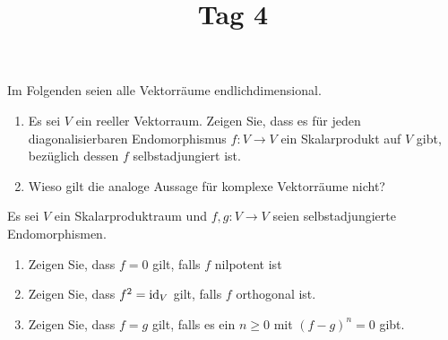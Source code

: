 \documentclass[a4paper, 10pt]{scrartcl}
\title{Tag 4}
\author{}
\date{}
\begin{document}
Im Folgenden seien alle Vektorräume endlichdimensional.





\begin{question}[subtitle = Diagonalisierbarkeit und Selbstadjungiertheit]
  \begin{enumerate}
    \item
      Es sei $V$ ein reeller Vektorraum.
      Zeigen Sie, dass es für jeden diagonalisierbaren Endomorphismus $f \colon V \to V$ ein Skalarprodukt auf $V$ gibt, bezüglich dessen $f$ selbstadjungiert ist.
    \item
      Wieso gilt die analoge Aussage für komplexe Vektorräume nicht?
  \end{enumerate}
\end{question}





\begin{question}[subtitle = Selbstadjungierte Endomorphismen]
  Es sei $V$ ein Skalarproduktraum und $f, g \colon V \to V$ seien selbstadjungierte Endomorphismen.
  \begin{enumerate}
    \item
      Zeigen Sie, dass $f = 0$ gilt, falls $f$ nilpotent ist
    \item
      Zeigen Sie, dass $f^2 = \operatorname{id}_V$ gilt, falls $f$ orthogonal ist.
    \item
      Zeigen Sie, dass $f = g$ gilt, falls es ein $n \geq 0$ mit $(f-g)^n = 0$ gibt.
  \end{enumerate}
\end{question}





\end{document}
